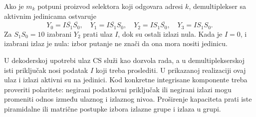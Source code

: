 
Ako je \(m_k\) potpuni proizvod selektora koji odgovara adresi \(k\), demultiplekser sa aktivnim jedinicama ostvaruje
\[
Y_0=I\overline{S_1}\overline{S_0},\quad
Y_1=I\overline{S_1}S_0,\quad
Y_2=IS_1\overline{S_0},\quad Y_3=IS_1S_0.
\]
Za \(S_1S_0=10\) izabrani \(Y_2\) prati ulaz \(I\), dok su ostali izlazi nula. Kada je \(I=0\), i izabrani izlaz je nula: izbor putanje ne znači da ona mora nositi jedinicu.

U dekoderskoj upotrebi ulaz CS služi kao dozvola rada, a u demultiplekserskoj isti priključak nosi podatak \(I\) koji treba proslediti. U prikazanoj realizaciji ovaj ulaz i izlazi aktivni su na jedinici. Kod konkretne integrisane komponente treba proveriti polaritete: negirani podatkovni priključak ili negirani izlazi mogu promeniti odnos između ulaznog i izlaznog nivoa. Proširenje kapaciteta prati iste piramidalne ili matrične postupke izbora izlazne grupe i izlaza u grupi.
